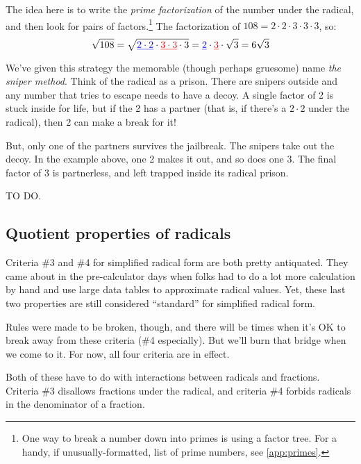The idea here is to write the \textit{prime factorization} of the number under the radical, and then look for pairs of factors.\footnote{One way to break a number down into primes is using a factor tree. For a handy, if unusually-formatted, list of prime numbers, see \cref{app:primes}.} The factorization of $108 = 2 \cdot 2 \cdot 3 \cdot 3 \cdot 3$, so: \[\sqrt{108} = \sqrt{\underline{\color{blue}2 \cdot 2} \cdot \underline{\color{red}3 \cdot 3} \cdot 3} = \underline{\color{blue}2} \cdot \underline{\color{red}3} \cdot \sqrt{3} = 6\sqrt{3} \]

We've given this strategy the memorable (though perhaps gruesome) name \textit{the sniper method}. Think of the radical as a prison. There are snipers outside and any number that tries to escape needs to have a decoy. A single factor of 2 is stuck inside for life, but if the 2 has a partner (that is, if there's a $2 \cdot 2$ under the radical), then 2 can make a break for it!

But, only one of the partners survives the jailbreak. The snipers take out the decoy. In the example above, one 2 makes it out, and so does one 3. The final factor of 3 is partnerless, and left trapped inside its radical prison.

\begin{boxedex}
	TO DO.
\end{boxedex}

\subsection{Quotient properties of radicals}
\label{sec:radquotient}

Criteria \#3 and \#4 for simplified radical form are both pretty antiquated. They came about in the pre-calculator days when folks had to do a lot more calculation by hand and use large data tables to approximate radical values. Yet, these last two properties are still considered ``standard'' for simplified radical form.


Rules were made to be broken, though, and there will be times when it's OK to break away from these criteria (\#4 especially). But we'll burn that bridge when we come to it. For now, all four criteria are in effect.

Both of these have to do with interactions between radicals and fractions. Criteria \#3 disallows fractions under the radical, and criteria \#4 forbids radicals in the denominator of a fraction.

